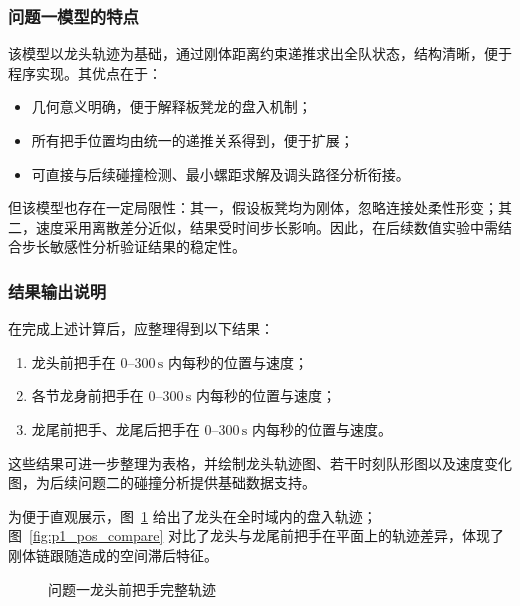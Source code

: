 \documentclass[12pt,a4paper]{ctexart}
\begin{document}
\subsubsection{问题一模型的特点}
该模型以龙头轨迹为基础，通过刚体距离约束递推求出全队状态，结构清晰，便于程序实现。其优点在于：
\begin{itemize}
    \item 几何意义明确，便于解释板凳龙的盘入机制；
    \item 所有把手位置均由统一的递推关系得到，便于扩展；
    \item 可直接与后续碰撞检测、最小螺距求解及调头路径分析衔接。
\end{itemize}

但该模型也存在一定局限性：其一，假设板凳均为刚体，忽略连接处柔性形变；其二，速度采用离散差分近似，结果受时间步长影响。因此，在后续数值实验中需结合步长敏感性分析验证结果的稳定性。

\subsubsection{结果输出说明}
在完成上述计算后，应整理得到以下结果：
\begin{enumerate}
    \item 龙头前把手在 $0$--$300\,\mathrm{s}$ 内每秒的位置与速度；
    \item 各节龙身前把手在 $0$--$300\,\mathrm{s}$ 内每秒的位置与速度；
    \item 龙尾前把手、龙尾后把手在 $0$--$300\,\mathrm{s}$ 内每秒的位置与速度。
\end{enumerate}

\noindent 这些结果可进一步整理为表格，并绘制龙头轨迹图、若干时刻队形图以及速度变化图，为后续问题二的碰撞分析提供基础数据支持。

为便于直观展示，图~\ref{fig:p1_head_traj} 给出了龙头在全时域内的盘入轨迹；图~\ref{fig:p1_pos_compare} 对比了龙头与龙尾前把手在平面上的轨迹差异，体现了刚体链跟随造成的空间滞后特征。

\begin{figure}[H]
\centering
{}
\caption{问题一龙头前把手完整轨迹}
\label{fig:p1_head_traj}
\end{figure}
\end{document}
